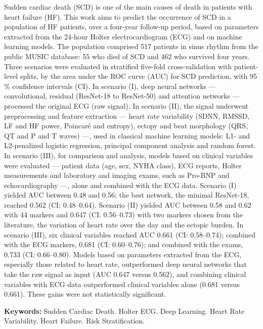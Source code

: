 Sudden cardiac death (SCD) is one of the main causes of death in patients
with heart failure (HF). This work aims to predict the occurrence of SCD in
a population of HF patients, over a four-year follow-up period, based on
parameters extracted from the 24-hour Holter electrocardiogram (ECG) and on
machine learning models. The population comprised 517 patients in sinus
rhythm from the public MUSIC database: 55 who died of SCD and 462 who
survived four years. Three scenarios were evaluated in stratified five-fold
cross-validation with patient-level splits, by the area under the ROC curve
(AUC) for SCD prediction, with 95\,\% confidence intervals (CI). In scenario
(I), deep neural networks --- convolutional, residual (ResNet-18 to
ResNet-50) and attention networks --- processed the original ECG (raw
signal). In scenario (II), the signal underwent preprocessing and feature
extraction --- heart rate variability (SDNN, RMSSD, LF and HF power,
Poincaré and entropy), ectopy and beat morphology (QRS, QT and P and T
waves) ---, used in classical machine learning models: L1- and L2-penalized
logistic regression, principal component analysis and random forest. In
scenario (III), for comparison and analysis, models based on clinical
variables were evaluated --- patient data (age, sex, NYHA class), ECG
reports, Holter measurements and laboratory and imaging exams, such as
Pro-BNP and echocardiography ---, alone and combined with the ECG data.
Scenario (I) yielded AUC between 0.48 and 0.56; the best network, the
minimal ResNet-18, reached 0.562 (CI: 0.48--0.64). Scenario (II) yielded AUC
between 0.58 and 0.62 with 44 markers and 0.647 (CI: 0.56--0.73) with two
markers chosen from the literature, the variation of heart rate over the day
and the ectopic burden. In scenario (III), six clinical variables reached AUC
0.661 (CI: 0.58--0.74); combined with the ECG markers, 0.681 (CI:
0.60--0.76); and combined with the exams, 0.733 (CI: 0.66--0.80).
Models based on parameters extracted from the ECG, especially
those related to heart rate, outperformed deep neural networks that take the
raw signal as input (AUC 0.647 versus 0.562), and combining clinical
variables with ECG data outperformed clinical variables alone (0.681 versus
0.661). These gains were not statistically significant.

\textbf{Keywords:} Sudden Cardiac Death. Holter ECG. Deep Learning. Heart Rate
Variability. Heart Failure. Risk Stratification.
